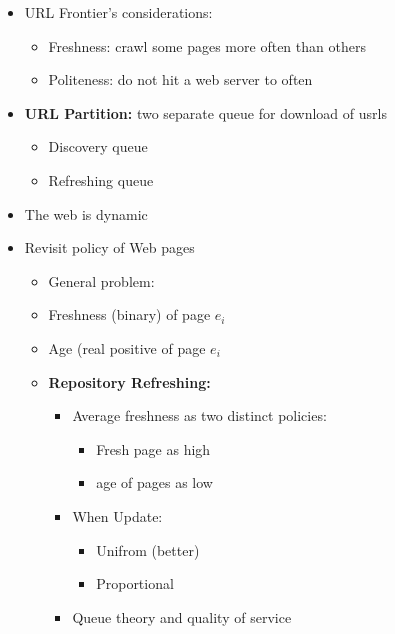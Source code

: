 \begin{itemize}
\begin{itemize}
\begin{itemize}
        \end{itemize}
    \end{itemize}
    \item URL Frontier's considerations:
    \begin{itemize}
        \item Freshness: crawl some pages more often than others
        \item Politeness: do not hit a web server to often
    \end{itemize}
    \item \textbf{URL Partition:} two separate queue for download of usrls
    \begin{itemize}
        \item Discovery queue
        \item Refreshing queue
    \end{itemize}
    \item The web is dynamic
    \item Revisit policy of Web pages
    \begin{itemize}
        \item General problem:
        \item Freshness (binary) of page \(e_i\)
        \item Age (real positive of page \(e_i\)
        \item \textbf{Repository Refreshing:}
        \begin{itemize}
            \item Average freshness as two distinct policies:
            \begin{itemize}
                \item Fresh page as high
                \item age of pages as low
            \end{itemize}
            \item When Update:
            \begin{itemize}
                \item Unifrom (better)
                \item Proportional
            \end{itemize}
            \item Queue theory and quality of service
        \end{itemize}
    \end{itemize}
    
\end{itemize}

